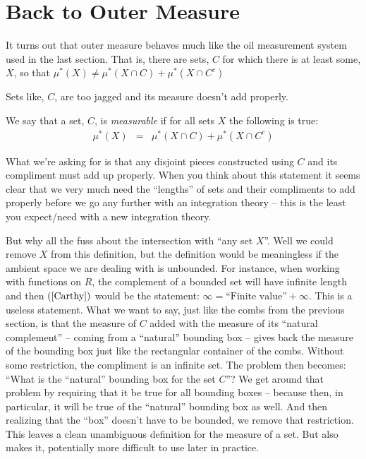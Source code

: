 \documentclass{article}
\begin{document}
\section{Back to Outer Measure}
It turns out that outer measure behaves much like the oil measurement system 
used in the last section. That is, there are sets, $C$ for which there is at 
least some, $X$, so that
$\mu^*(X) \neq \mu^*(X \cap C) + \mu^*(X \cap C^c)$

Sets like, $C$, are too jagged and its measure doesn't add properly.

We say that a set, $C$, is {\em measurable\/}
if for all sets $X$ the following is true:
\begin{eqnarray}
	\mu^*(X) & = & \mu^*(X \cap C) + \mu^*(X \cap C^c) \label{Carthy}
\end{eqnarray}

What we're asking for is that any disjoint pieces constructed using $C$ and 
its compliment must add up properly. When you think about this statement it
seems clear that we very much need the ``lengths'' of sets and their compliments
to add properly before we go any further with an integration theory -- this 
is the least you expect/need with a new integration theory.

But why all the fuss about the intersection with ``any set $X$''.
Well we could remove $X$ from this definition, but the definition would be 
meaningless if the ambient space we are dealing with is unbounded. For instance,
when working with functions on $R$, the complement of a bounded set will have 
infinite length and then $(\ref{Carthy})$ would be the statement: 
$\infty = \text{``Finite value''} + \infty$.
This is a useless statement. What we want to say, just like the combs from the
previous section, is that the measure of $C$ added with the measure of its 
``natural complement'' -- coming from a ``natural'' bounding box -- 
gives back the measure of the bounding box just like the rectangular
container of the combs. Without some restriction, the compliment is an infinite set.
The problem then becomes: ``What is the ``natural'' bounding box for the set $C$''?
We get around that problem by requiring that it be true for all bounding boxes -- 
because then, in particular, it will be true of the ``natural'' bounding box as well.
And then realizing that the ``box'' doesn't have to be bounded, we remove that restriction.
This leaves a clean unambiguous definition for the measure of a set. But also makes it,
potentially more difficult to use later in practice.
 
\end{document}
